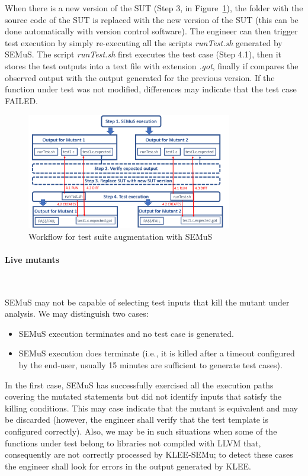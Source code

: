 When there is a new version of the SUT (Step 3, in Figure~\ref{fig:semus:test:example}), the folder with the source code of the SUT is replaced with the new version of the SUT (this can be done automatically with version control software).
The engineer can then trigger test execution by simply re-executing all the scripts \emph{runTest.sh} generated by SEMuS.
The script \emph{runTest.sh} first executes the test case (Step 4.1), then it stores the test outputs into a text file with extension \emph{.got}, finally if compares the observed output with the output generated for the previous version. If the function under test was not modified, differences may indicate that the test case FAILED.

\begin{figure}[h]
\begin{center}
\includegraphics[width=0.8\textwidth]{images/semus-out}
\caption{Workflow for test suite augmentation with SEMuS}
\label{fig:semus:test:example}
\end{center}
\end{figure}

\paragraph{Live mutants}\ 

SEMuS may not be capable of selecting test inputs that kill the mutant under analysis. We may distinguish two cases:
\begin{itemize}
\item SEMuS execution terminates and no test case is generated.
\item SEMuS execution does terminate (i.e., it is killed after a timeout configured by the end-user, usually 15 minutes are sufficient to generate test cases).
\end{itemize}

In the first case, SEMuS has successfully exercised all the execution paths covering the mutated statements but did not identify inputs that satisfy the killing conditions. This may case indicate that the mutant is equivalent and may be discarded (however, the engineer shall verify that the test template is configured correctly). Also, we may be in such situations when some of the functions under test belong to libraries not compiled with LLVM that, consequently are not correctly processed by KLEE-SEMu; to detect these cases the engineer shall look for errors in the output generated by KLEE.

